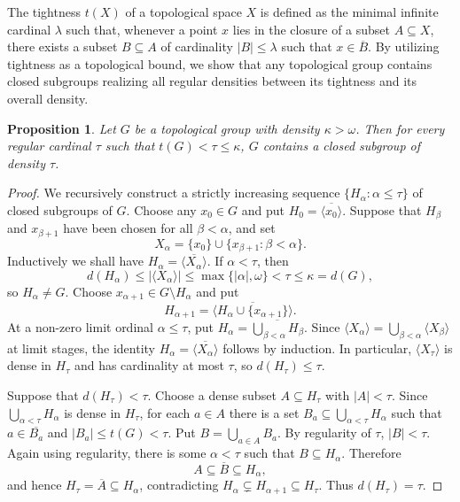 \documentclass[12pt]{amsart}
\newtheorem{proposition}[theorem]{Proposition}
\theoremstyle{definition}
\numberwithin{equation}{section}
\theoremstyle{remark}
\begin{document}
The tightness $t(X)$ of a topological space $X$ is defined as the minimal infinite cardinal $\lambda$ such that, whenever a point $x$ lies in the closure of a subset $A \subseteq X$, there exists a subset $B \subseteq A$ of cardinality $|B| \le \lambda$ such that $x \in \overline{B}$. By utilizing tightness as a topological bound, we show that any topological group contains closed subgroups realizing all regular densities between its tightness and its overall density.


\begin{proposition}\label{Prop:t}
Let $G$ be a topological group with density $\kappa > \omega$. Then for every regular cardinal $\tau$ such that $t(G) < \tau \le \kappa$, $G$ contains a closed subgroup of density $\tau$.
\end{proposition}

\begin{proof}
We recursively construct a strictly increasing sequence
$\{H_\alpha:\alpha\leq\tau\}$ of closed subgroups of $G$. Choose any
$x_0\in G$ and put $H_0=\overline{\langle x_0\rangle}$. Suppose that
$H_\beta$ and $x_{\beta+1}$ have been chosen for all $\beta<\alpha$, and set
\[
X_\alpha=\{x_0\}\cup\{x_{\beta+1}:\beta<\alpha\}.
\]
Inductively we shall have $H_\alpha=\overline{\langle X_\alpha\rangle}$.
If $\alpha<\tau$, then
\[
d(H_\alpha)\leq |\langle X_\alpha\rangle|
\leq\max\{|\alpha|,\omega\}<\tau\leq\kappa=d(G),
\]
so $H_\alpha\neq G$. Choose $x_{\alpha+1}\in G\setminus H_\alpha$ and put
\[
H_{\alpha+1}=\overline{\langle H_\alpha\cup\{x_{\alpha+1}\}\rangle}.
\]
At a non-zero limit ordinal $\alpha\leq\tau$, put
$H_\alpha=\overline{\bigcup_{\beta<\alpha}H_\beta}$. Since
$\langle X_\alpha\rangle=\bigcup_{\beta<\alpha}\langle X_\beta\rangle$
at limit stages, the identity
$H_\alpha=\overline{\langle X_\alpha\rangle}$ follows by induction.
In particular, $\langle X_\tau\rangle$ is dense in $H_\tau$ and has
cardinality at most $\tau$, so $d(H_\tau)\leq\tau$.

Suppose that $d(H_\tau)<\tau$. Choose a dense subset $A\subseteq H_\tau$ with $|A|<\tau$. Since $\bigcup_{\alpha<\tau}H_\alpha$ is dense in $H_\tau$, for each $a\in A$ there is a set
$B_a\subseteq\bigcup_{\alpha<\tau}H_\alpha$ such that
$a\in\overline{B_a}$ and $|B_a|\leq t(G)<\tau$. Put $B=\bigcup_{a\in A}B_a$. By regularity of $\tau$, $|B|<\tau$. Again using regularity, there is some $\alpha<\tau$ such that $B\subseteq H_\alpha$. Therefore
\[
A\subseteq\overline B\subseteq H_\alpha,
\]
and hence $H_\tau=\overline A\subseteq H_\alpha$, contradicting
$H_\alpha\subsetneq H_{\alpha+1}\subseteq H_\tau$. Thus $d(H_\tau)=\tau$.
\end{proof}
\end{document}
